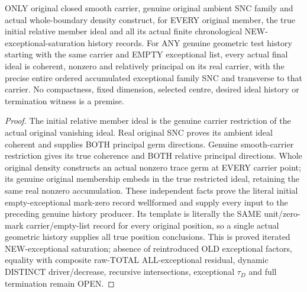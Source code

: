 \begin{theorem}
\label{hir:sharp-original-all-member-actual-finite-chronological-history}
\leanok
ONLY original closed smooth carrier, genuine original ambient SNC family
and actual whole-boundary density construct, for EVERY original member,
the true initial relative member ideal and all its actual finite chronological
NEW-exceptional-saturation history records. For ANY genuine geometric test
history starting with the same carrier and EMPTY exceptional list, every
actual final ideal is coherent, nonzero and relatively principal on its
real carrier, with the precise entire ordered accumulated exceptional family
SNC and transverse to that carrier. No compactness, fixed dimension, selected
centre, desired ideal history or termination witness is a premise.
\end{theorem}
\begin{proof}
The initial relative member ideal is the genuine carrier restriction of the
actual original vanishing ideal. Real original SNC proves its ambient ideal
coherent and supplies BOTH principal germ directions. Genuine smooth-carrier
restriction gives its true coherence and BOTH relative principal directions.
Whole original density constructs an actual nonzero trace germ at EVERY
carrier point; its genuine original membership embeds in the true restricted
ideal, retaining the same real nonzero accumulation. These independent facts
prove the literal initial empty-exceptional mark-zero record wellformed and
supply every input to the preceding genuine history producer. Its template
is literally the SAME unit/zero-mark carrier/empty-list record for every
original position, so a single actual geometric history supplies all true
position conclusions. This is proved iterated NEW-exceptional saturation;
absence of reintroduced OLD exceptional factors, equality with composite
raw-TOTAL ALL-exceptional residual, dynamic DISTINCT driver/decrease,
recursive intersections, exceptional $\tau_D$ and full termination remain OPEN.
\end{proof}

